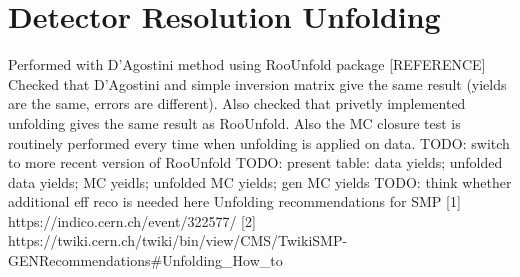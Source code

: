 \section{Detector Resolution Unfolding}
\label{sec:Unfolding}
Performed with D'Agostini method using RooUnfold package [REFERENCE]
Checked that D'Agostini and simple inversion matrix give the same result (yields are the same, errors are different). Also checked that privetly implemented unfolding gives the same result as RooUnfold. Also the MC closure test is routinely performed every time when unfolding is applied on data. 
TODO: switch to more recent version of RooUnfold
TODO: present table: data yields; unfolded data yields; MC yeidls; unfolded MC yields; gen MC yields
TODO: think whether additional eff reco is needed here
Unfolding recommendations for SMP 
[1] https://indico.cern.ch/event/322577/ 
[2] https://twiki.cern.ch/twiki/bin/view/CMS/TwikiSMP-GENRecommendations\#Unfolding\_How\_to
